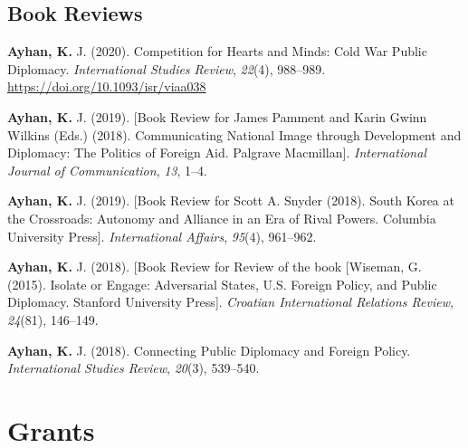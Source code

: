 \documentclass[11pt,a4paper,]{awesome-cv}
\begin{document}
\hypertarget{book-reviews}{%
\subsection{Book Reviews}\label{book-reviews}}

\hypertarget{refs_reviews}{}
\leavevmode{}%
\textbf{Ayhan, K.} J. (2020). Competition for {Hearts} and {Minds}:
{Cold} {War} {Public} {Diplomacy}. \emph{International Studies Review},
\emph{22}(4), 988--989. \url{https://doi.org/10.1093/isr/viaa038}

\leavevmode{}%
\textbf{Ayhan, K.} J. (2019). {[}{Book} {Review} for {James} {Pamment}
and {Karin} {Gwinn} {Wilkins} ({Eds}.) (2018). {Communicating}
{National} {Image} through {Development} and {Diplomacy}: {The}
{Politics} of {Foreign} {Aid}. {Palgrave} {Macmillan}{]}.
\emph{International Journal of Communication}, \emph{13}, 1--4.

\leavevmode{}%
\textbf{Ayhan, K.} J. (2019). {[}{Book} {Review} for {Scott} {A}.
{Snyder} (2018). {South} {Korea} at the {Crossroads}: {Autonomy} and
{Alliance} in an {Era} of {Rival} {Powers}. {Columbia} {University}
{Press}{]}. \emph{International Affairs}, \emph{95}(4), 961--962.

\leavevmode{}%
\textbf{Ayhan, K.} J. (2018). {[}{Book} {Review} for {Review} of the
book {[}{Wiseman}, {G}. (2015). {Isolate} or {Engage}: {Adversarial}
{States}, {U}.{S}. {Foreign} {Policy}, and {Public} {Diplomacy}.
{Stanford} {University} {Press}{]}. \emph{Croatian International
Relations Review}, \emph{24}(81), 146--149.

\leavevmode{}%
\textbf{Ayhan, K.} J. (2018). Connecting {Public} {Diplomacy} and
{Foreign} {Policy}. \emph{International Studies Review}, \emph{20}(3),
539--540.

\hypertarget{grants}{%
\section{Grants}\label{grants}}
\end{document}
